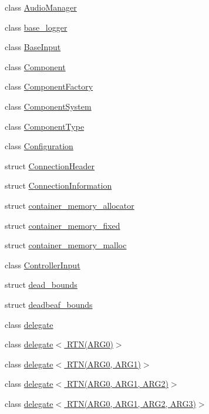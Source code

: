 \begin{DoxyCompactItemize}
class \hyperlink{classcrap_1_1_audio_manager}{Audio\+Manager}
\item 
class \hyperlink{classcrap_1_1base__logger}{base\+\_\+logger}
\item 
class \hyperlink{classcrap_1_1_base_input}{Base\+Input}
\item 
class \hyperlink{classcrap_1_1_component}{Component}
\item 
class \hyperlink{classcrap_1_1_component_factory}{Component\+Factory}
\item 
class \hyperlink{classcrap_1_1_component_system}{Component\+System}
\item 
class \hyperlink{classcrap_1_1_component_type}{Component\+Type}
\item 
class \hyperlink{classcrap_1_1_configuration}{Configuration}
\item 
struct \hyperlink{structcrap_1_1_connection_header}{Connection\+Header}
\item 
struct \hyperlink{structcrap_1_1_connection_information}{Connection\+Information}
\item 
struct \hyperlink{structcrap_1_1container__memory__allocator}{container\+\_\+memory\+\_\+allocator}
\item 
struct \hyperlink{structcrap_1_1container__memory__fixed}{container\+\_\+memory\+\_\+fixed}
\item 
struct \hyperlink{structcrap_1_1container__memory__malloc}{container\+\_\+memory\+\_\+malloc}
\item 
class \hyperlink{classcrap_1_1_controller_input}{Controller\+Input}
\item 
struct \hyperlink{structcrap_1_1dead__bounds}{dead\+\_\+bounds}
\item 
struct \hyperlink{structcrap_1_1deadbeaf__bounds}{deadbeaf\+\_\+bounds}
\item 
class \hyperlink{classcrap_1_1delegate}{delegate}
\item 
class \hyperlink{classcrap_1_1delegate_3_01_r_t_n_07_a_r_g0_08_4}{delegate$<$ R\+T\+N(\+A\+R\+G0)$>$}
\item 
class \hyperlink{classcrap_1_1delegate_3_01_r_t_n_07_a_r_g0_00_01_a_r_g1_08_4}{delegate$<$ R\+T\+N(\+A\+R\+G0, A\+R\+G1)$>$}
\item 
class \hyperlink{classcrap_1_1delegate_3_01_r_t_n_07_a_r_g0_00_01_a_r_g1_00_01_a_r_g2_08_4}{delegate$<$ R\+T\+N(\+A\+R\+G0, A\+R\+G1, A\+R\+G2)$>$}
\item 
class \hyperlink{classcrap_1_1delegate_3_01_r_t_n_07_a_r_g0_00_01_a_r_g1_00_01_a_r_g2_00_01_a_r_g3_08_4}{delegate$<$ R\+T\+N(\+A\+R\+G0, A\+R\+G1, A\+R\+G2, A\+R\+G3)$>$}

\end{DoxyCompactItemize}
